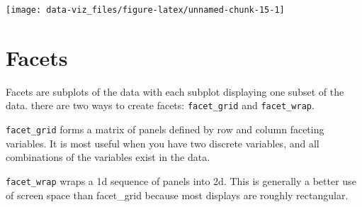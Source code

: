 \documentclass[]{book}
\theoremstyle{definition}
\theoremstyle{definition}
\theoremstyle{definition}
\theoremstyle{remark}
\begin{document}
\begin{center}\texttt{[image: data-viz\_files/figure-latex/unnamed-chunk-15-1]} \end{center}

\section{Facets}\label{facets}

Facets are subplots of the data with each subplot displaying one subset
of the data. there are two ways to create facets: \texttt{facet\_grid}
and \texttt{facet\_wrap}.

\texttt{facet\_grid} forms a matrix of panels defined by row and column
faceting variables. It is most useful when you have two discrete
variables, and all combinations of the variables exist in the data.

\texttt{facet\_wrap} wraps a 1d sequence of panels into 2d. This is
generally a better use of screen space than facet\_grid because most
displays are roughly rectangular.
\end{document}

